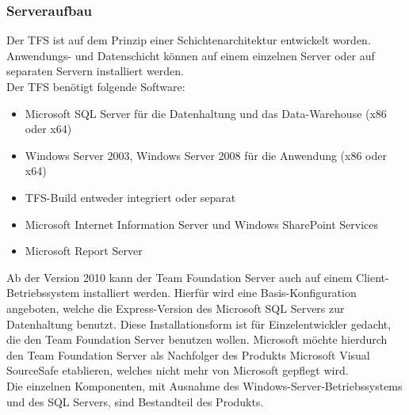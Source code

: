 \documentclass[10pt]{article}
\begin{document}
\subsubsection{Serveraufbau}
Der TFS ist auf dem Prinzip einer Schichtenarchitektur entwickelt worden. Anwendungs- und Datenschicht können auf einem einzelnen Server oder auf separaten Servern installiert werden. \\
Der TFS benötigt folgende Software:
\begin{itemize}
	\item Microsoft SQL Server für die Datenhaltung und das Data-Warehouse (x86 oder x64)
	\item Windows Server 2003, Windows Server 2008 für die Anwendung (x86 oder x64)
	\item TFS-Build entweder integriert oder separat
	\item Microsoft Internet Information Server und Windows SharePoint Services
	\item Microsoft Report Server
\end{itemize}
Ab der Version 2010 kann der Team Foundation Server auch auf einem Client-Betriebssystem installiert werden. Hierfür wird eine Basis-Konfiguration angeboten, welche die Express-Version des Microsoft SQL Servers zur Datenhaltung benutzt. Diese Installationsform ist für Einzelentwickler gedacht, die den Team Foundation Server benutzen wollen. Microsoft möchte hierdurch den Team Foundation Server als Nachfolger des Produkts Microsoft Visual SourceSafe etablieren, welches nicht mehr von Microsoft gepflegt wird. \\
Die einzelnen Komponenten, mit Ausnahme des Windows-Server-Betriebssystems und des SQL Servers, sind Bestandteil des Produkts.

\pagebreak
\end{document}
